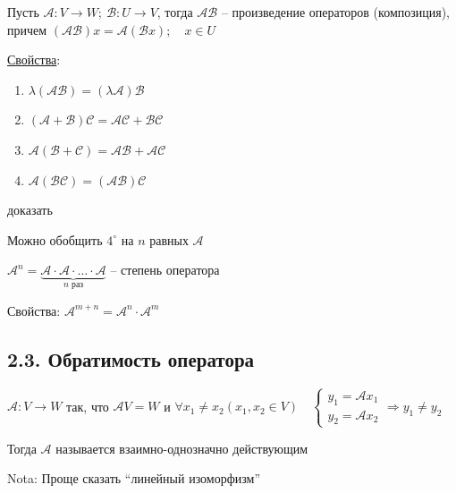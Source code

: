 \documentclass[12pt]{article}
\begin{document}
    \Def Пусть $\mathcal{A} : V \rightarrow W; \ \mathcal{B} : U \rightarrow V$, тогда 
    $\mathcal{A}\mathcal{B}$ -- произведение операторов (композиция), причем
    $(\mathcal{A}\mathcal{B}) x = \mathcal{A}(\mathcal{B}x); \quad x \in U$

    \hypertarget{linearoperatorproperties}{}

    \underline{Свойства}: 

    \begin{enumerate}[label*=\arabic*$^\circ$]
        \item $\lambda (\mathcal{A}\mathcal{B}) = (\lambda \mathcal{A})\mathcal{B}$

        \item $(\mathcal{A} + \mathcal{B}) \mathcal{C} = \mathcal{A}\mathcal{C} + \mathcal{B}\mathcal{C}$

        \item $\mathcal{A} (\mathcal{B} + \mathcal{C}) = \mathcal{A}\mathcal{B} + \mathcal{A}\mathcal{C}$

        \item $\mathcal{A} (\mathcal{B}\mathcal{C}) = (\mathcal{A}\mathcal{B}) \mathcal{C}$
    \end{enumerate}

    \Lab доказать

    \Nota Можно обобщить $4^\circ$ на $n$ равных $\mathcal{A}$

    \Defs $\mathcal{A}^n = \underset{n \text{ раз}}{\underbrace{\mathcal{A} \cdot \mathcal{A} \cdot \dots \cdot \mathcal{A}}}$ -- степень оператора

    Свойства: $\mathcal{A}^{m + n} = \mathcal{A}^n \cdot \mathcal{A}^m$

    \subsection[p2\_3]{2.3. Обратимость оператора}

    \hypertarget{onetoonelinearoperator}{}

    \Def $\mathcal{A} : V \rightarrow W$ так, что $\mathcal{A}V = W$ и $\forall x_1 \neq x_2 (x_1, x_2 \in V) \quad
    \begin{cases}y_1 = \mathcal{A}x_1 \\ y_2 = \mathcal{A}x_2\end{cases} \Longrightarrow y_1 \neq y_2$

    Тогда $\mathcal{A}$ называется взаимно-однозначно действующим

    Nota: Проще сказать \enquote{линейный изоморфизм}
\end{document}
